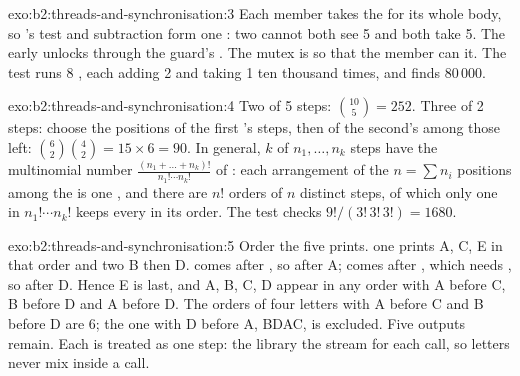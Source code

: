 \begin{solution}{exo:b2:threads-and-synchronisation:3}
Each member takes the  for its whole body, so 's test and subtraction form one : two
 cannot both see 5 and both take 5. The early  unlocks through the guard's . The
mutex is  so that the  member  can  it. The test runs 8 , each adding 2
and taking 1 ten thousand times, and finds 80\,000.
\end{solution}

\begin{solution}{exo:b2:threads-and-synchronisation:4}
Two  of 5 steps: $\binom{10}{5} = 252$. Three  of 2 steps: choose the positions of the first 's
steps, then of the second's among those left: $\binom{6}{2}\binom{4}{2} = 15 \times 6 = 90$. In general, $k$ 
of $n_1, \dots, n_k$ steps have the multinomial number
$\frac{(n_1 + \dots + n_k)!}{n_1! \cdots n_k!}$ of : each arrangement of the $n = \sum n_i$ positions
among the  is one , and there are $n!$ orders of $n$ distinct steps, of which only one in
$n_1! \cdots n_k!$ keeps every  in its order. The test checks $9!/(3!\,3!\,3!) = 1680$.
\end{solution}

\begin{solution}{exo:b2:threads-and-synchronisation:5}
Order the five prints.  one prints A, C, E in that order and  two B then D.  comes after
, so after A;  comes after , which needs , so after D. Hence E is
last, and A, B, C, D appear in any order with A before C, B before D and A before D. The orders of four letters with A
before C and B before D are 6; the one with D before A, BDAC, is excluded. Five outputs remain. Each 
is treated as one step: the library  the stream for each call, so letters never mix inside a call.
\end{solution}

